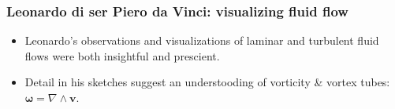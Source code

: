 \documentclass[10pt]{beamer}
\begin{document}
\begin{frame}
  \frametitle{Leonardo  di ser Piero da Vinci: visualizing fluid flow}

\begin{center}
\vspace{-.25cm}
\hspace{1.5cm}  
\end{center}

\begin{exampleblock}{}
\begin{itemize}
\item Leonardo's observations and visualizations of laminar and
  turbulent fluid flows were both insightful and prescient.
\item Detail in his sketches suggest an understooding of vorticity \&
  vortex tubes: ${\bm \omega} = \nabla \wedge {\bm v}$.
\end{itemize}
\end{exampleblock}{}

\end{frame}
\end{document}
